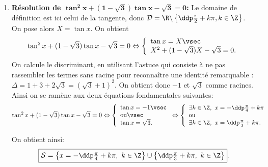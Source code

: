 \begin{correction}  \;
\begin{enumerate}
\item  \textbf{R\'esolution de $\mathbf{ \tan^2{x}+(1-\sqrt{3})\tan{x}-\sqrt{3}=0 }$:}
Le domaine de d\'efinition est ici celui de la tangente, donc $\mathcal{D} = \R \backslash \left\{\ddp \frac{\pi}{2}+k\pi, k \in \Z\right\}$.
On pose alors $X=\tan{x}$.
On obtient
$$
\tan^2{x}+(1-\sqrt{3})\tan{x}-\sqrt{3}=0\Leftrightarrow 
\left\lbrace\begin{array}{l}
\tan{x}=X\vsec\\
X^2+(1-\sqrt{3})X-\sqrt{3}=0.
\end{array}\right.$$
On calcule le discriminant, en utilisant l'astuce qui consiste \`a ne pas rassembler les termes sans racine pour reconna\^itre une identit\'e remarquable : $\Delta=1+3+2\sqrt{3}=(\sqrt{3}+1)^2.$ On obtient donc $-1$ et $\sqrt{3}$ comme racines. Ainsi on se ram\`ene aux deux \'equations fondamentales suivantes:
$$
\tan^2{x}+(1-\sqrt{3})\tan{x}-\sqrt{3}=0\Leftrightarrow
\left\lbrace\begin{array}{l}
\tan{x}=-1\vsec\\
\hbox{ou}\vsec\\
\tan{x}=\sqrt{3}.
\end{array}\right.
\Leftrightarrow
\left\lbrace\begin{array}{l}
\exists k\in\Z,\ x=-\ddp\frac{\pi}{4}+k\pi\\
\hbox{ou}\\
\exists k\in\Z,\ x=\ddp\frac{\pi}{3}+k\pi.\\
\end{array} \right.
$$
\begin{minipage}[c]{0.45\textwidth}
On obtient ainsi: 
$$\fbox{$\mathcal{S}=\left\lbrace x=-\ddp\frac{\pi}{4}+k\pi,\ k\in\Z\right\rbrace\cup\left\lbrace \ddp\frac{\pi}{3}+k\pi,\ k\in\Z\right\rbrace$}.$$
\end{minipage}
\quad \begin{minipage}[c]{0.45\textwidth}
\begin{center}
\end{center}
\end{minipage}
\end{enumerate}
\end{correction}
